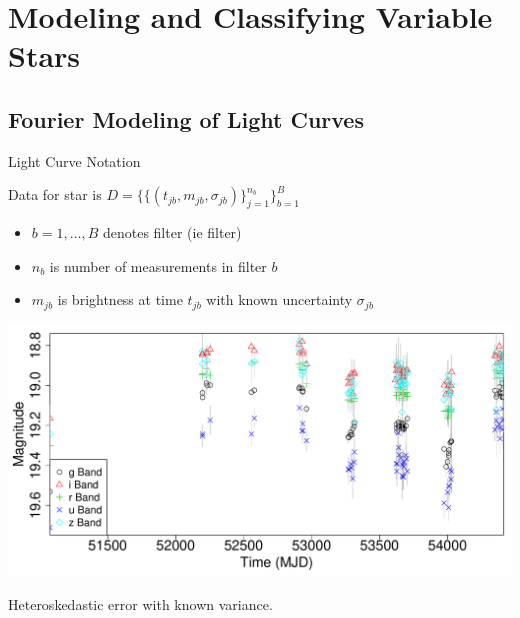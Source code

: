 \documentclass[12pt]{beamer}
\begin{document}
\section{Modeling and Classifying Variable Stars}

\subsection{Fourier Modeling of Light Curves}

\begin{frame}{Light Curve Notation}

  Data for star is $D=\{\{(t_{jb},m_{jb},\sigma_{jb})\}_{j=1}^{n_b}\}_{b=1}^B$
\begin{itemize}
\item $b=1,\ldots,B$ denotes filter (ie filter)
\item $n_b$ is number of measurements in filter $b$
\item $m_{jb}$ is brightness at time $t_{jb}$ with known uncertainty $\sigma_{jb}$
\end{itemize}

\begin{center}
\includegraphics[scale=0.3]{figs/unfolded_7904669.pdf}
\end{center}

\begin{center}
  Heteroskedastic error with known variance.
\end{center}

\end{frame}
\end{document}
